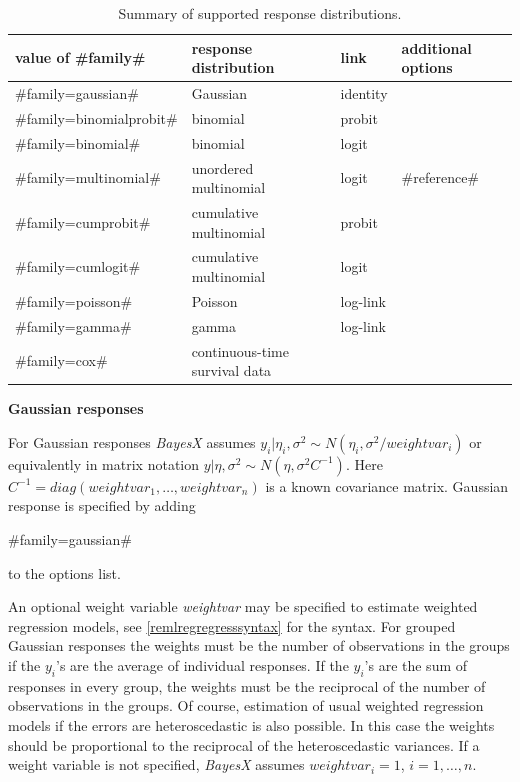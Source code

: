 \begin{table}[ht]
\begin{center}
\begin{tabular} {|l|l|l|l|}
 \hline
 value of #family# & response distribution & link & additional options\\
 \hline
 \hline
 #family=gaussian#            & Gaussian              & identity & \\
 \hline
 #family=binomialprobit#      & binomial              & probit & \\
 #family=binomial#            & binomial              & logit & \\
 \hline
 #family=multinomial#         & unordered multinomial & logit & #reference#\\
 \hline
 #family=cumprobit#           & cumulative multinomial   & probit & \\
 #family=cumlogit#            & cumulative multinomial   & logit & \\
 \hline
 #family=poisson#             & Poisson               & log-link & \\
 \hline
 #family=gamma#               & gamma                 & log-link & \\
 \hline
 #family=cox#                 & continuous-time survival data & & \\
 \hline
\end{tabular}
{\em \caption {\label{remlregfamilyopt} Summary of supported
response distributions.}}
\end{center}
\end{table}

{\bf Gaussian responses}

For Gaussian responses {\em BayesX} assumes $y_i | \eta_i,\sigma^2
\sim N(\eta_i,\sigma^2/weightvar_i)$ or equivalently in matrix
notation $y | \eta, \sigma^2 \sim N(\eta,\sigma^2C^{-1})$. Here
$C^{-1}=diag(weightvar_1,\dots,weightvar_n)$ is a known covariance
matrix. Gaussian response is specified by adding

#family=gaussian#

to the options list.

An optional weight variable {\em weightvar} may be specified to
estimate weighted regression models, see
\autoref{remlregregresssyntax} for the syntax. For grouped
Gaussian responses the weights must be the number of observations
in the groups if the $y_i$'s are the average of individual
responses. If the $y_i$'s are the sum of responses in every group,
the weights must be the reciprocal of the number of observations
in the groups. Of course, estimation of usual weighted regression
models if the errors are heteroscedastic is also possible. In this
case the weights should be proportional to the reciprocal of the
heteroscedastic variances. If a weight variable is not specified,
{\em BayesX} assumes $weightvar_i = 1$, $i=1,\dots,n$.

